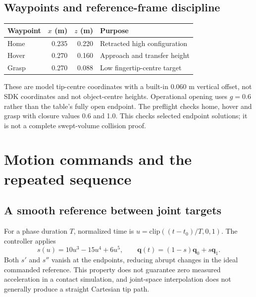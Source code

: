 \subsection{Waypoints and reference-frame discipline}
\begin{center}
\begin{tabular}{@{}lrrl@{}}\toprule
Waypoint & $x$ (m) & $z$ (m) & Purpose\\\midrule
Home & 0.235 & 0.220 & Retracted high configuration\\
Hover & 0.270 & 0.160 & Approach and transfer height\\
Grasp & 0.270 & 0.088 & Low fingertip-centre target\\\bottomrule
\end{tabular}
\end{center}
These are model tip-centre coordinates with a built-in 0.060 m vertical offset, not SDK coordinates and not object-centre heights. Operational opening uses $g=0.6$ rather than the table's fully open endpoint. The preflight checks home, hover and grasp with closure values 0.6 and 1.0. This checks selected endpoint solutions; it is not a complete swept-volume collision proof.
\clearpage
\section{Motion commands and the repeated sequence}
\subsection{A smooth reference between joint targets}
For a phase duration $T$, normalized time is $u=\mathrm{clip}((t-t_0)/T,0,1)$. The controller applies
\begin{equation}
s(u)=10u^3-15u^4+6u^5,\qquad
\mathbf q(t)=(1-s)\mathbf q_0+s\mathbf q_1.
\end{equation}
Both $s'$ and $s''$ vanish at the endpoints, reducing abrupt changes in the ideal commanded reference. This property does not guarantee zero measured acceleration in a contact simulation, and joint-space interpolation does not generally produce a straight Cartesian tip path.
\begin{center}
\end{center}
